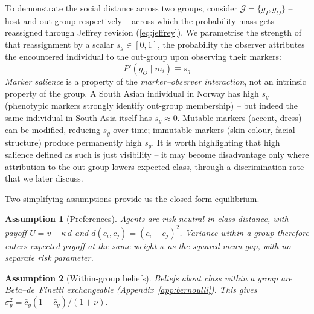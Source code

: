 \documentclass[pdflatex,sn-basic]{sn-jnl}
\newcommand{\G}{\mathcal{G}}
\theoremstyle{thmstyleone}
\newtheorem{assumption}{Assumption}
\numberwithin{proposition}{subsection}
\begin{document}
To demonstrate the social distance across two groups, consider $\G = \{g_I, g_O\}$ -- host and out-group respectively -- across which the probability mass gets reassigned through Jeffrey revision (\ref{eq:jeffrey}). We parametrise the strength of that reassignment by a scalar $s_g \in [0,1]$, the probability the observer attributes the
encountered individual to the out-group upon observing their
markers:
\begin{equation}
  P'(g_O \mid m_i) \equiv s_g
  \label{eq:salience}
\end{equation}
\emph{Marker salience} is a property of the \emph{marker--observer
interaction}, not an intrinsic property of the group. A South Asian
individual in Norway has high $s_g$ (phenotypic markers strongly
identify out-group membership) -- but indeed the same individual in South Asia itself
has $s_g \approx 0$. Mutable markers (accent, dress)
can be modified, reducing $s_g$ over time; immutable markers (skin
colour, facial structure) produce permanently high $s_g$. It is worth highlighting that high salience defined as such is just visibility -- it may become disadvantage only where attribution to the out-group lowers expected
class, through a discrimination rate that we later discuss.

Two simplifying assumptions provide us the closed-form equilibrium.

\begin{assumption}[Preferences]
\label{ass:preferences}
Agents are risk neutral in class distance, with payoff
$U = v - \kappa\,d$ and $d(c_i,c_j) = (c_i-c_j)^2$. Variance within a
group therefore enters expected payoff at the same weight $\kappa$ as
the squared mean gap, with no separate risk parameter.
\end{assumption}

\begin{assumption}[Within-group beliefs]
\label{ass:beliefs}
Beliefs about class within a group are Beta--de~Finetti exchangeable
(Appendix~\ref{app:bernoulli}). This gives
$\sigma_g^2 = \bar{c}_g(1-\bar{c}_g)/(1+\nu)$.
\end{assumption}
\end{document}
